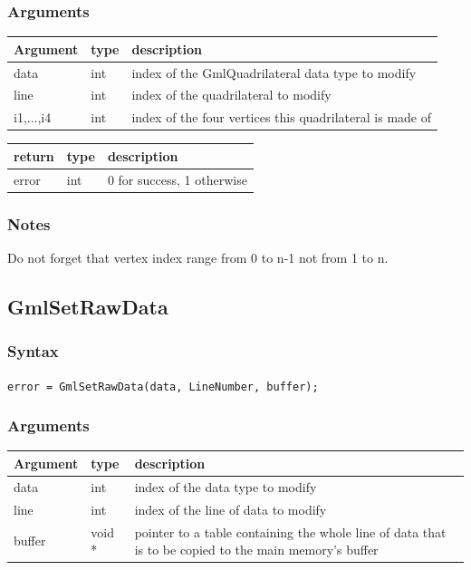 \documentclass[a4paper,12pt]{article}
\begin{document}
\subsubsection*{Arguments}

\begin{tabular}{|m{2cm}|m{1.5cm}|m{10.5cm}|}
\hline
Argument   & type   & description \\
\hline
data       & int    & index of the GmlQuadrilateral data type to modify \\
\hline
line       & int    & index of the quadrilateral to modify \\
\hline
i1,...,i4  & int    & index of the four vertices this quadrilateral is made of \\
\hline
\end{tabular}

\medskip

\begin{tabular}{|m{2cm}|m{1.5cm}|m{10.5cm}|}
\hline
return     & type   & description \\
\hline
error      & int    & 0 for success, 1 otherwise \\
\hline
\end{tabular}
\subsubsection*{Notes}
Do not forget that vertex index range from 0 to n-1 not from 1 to n.


\subsection{GmlSetRawData}
\subsubsection*{Syntax}

{\tt error = GmlSetRawData(data, LineNumber, buffer);}
\subsubsection*{Arguments}

\begin{tabular}{|m{2cm}|m{1.5cm}|m{10.5cm}|}
\hline
Argument   & type   & description \\
\hline
data       & int    & index of the data type to modify \\
\hline
line       & int    & index of the line of data to modify \\
\hline
buffer     & void * & pointer to a table containing the whole line of data that is to be copied to the main memory's buffer \\
\hline
\end{tabular}
\end{document}

